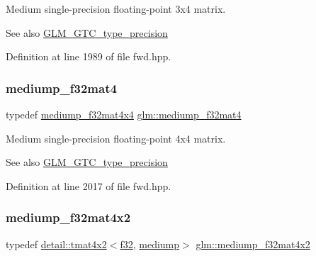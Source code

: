 Medium single-\/precision floating-\/point 3x4 matrix. \begin{DoxySeeAlso}{See also}
\hyperlink{group__gtc__type__precision}{G\+L\+M\+\_\+\+G\+T\+C\+\_\+type\+\_\+precision} 
\end{DoxySeeAlso}


Definition at line 1989 of file fwd.\+hpp.

\mbox{\label{group__gtc__type__precision_ga56bd98ec31b6abc0315d688d4ecd94a0}} 
\subsubsection{\texorpdfstring{mediump\+\_\+f32mat4}{mediump\_f32mat4}}
{\footnotesize\ttfamily typedef \hyperlink{group__gtc__type__precision_ga8f83086fffe71f9cd15e75a1de101ba6}{mediump\+\_\+f32mat4x4} \hyperlink{group__gtc__type__precision_ga56bd98ec31b6abc0315d688d4ecd94a0}{glm\+::mediump\+\_\+f32mat4}}

Medium single-\/precision floating-\/point 4x4 matrix. \begin{DoxySeeAlso}{See also}
\hyperlink{group__gtc__type__precision}{G\+L\+M\+\_\+\+G\+T\+C\+\_\+type\+\_\+precision} 
\end{DoxySeeAlso}


Definition at line 2017 of file fwd.\+hpp.

\mbox{\label{group__gtc__type__precision_ga3400d5463f0a58cf3959406aa2b69f72}} 
\subsubsection{\texorpdfstring{mediump\+\_\+f32mat4x2}{mediump\_f32mat4x2}}
{\footnotesize\ttfamily typedef \hyperlink{structglm_1_1detail_1_1tmat4x2}{detail\+::tmat4x2}$<$\hyperlink{group__gtc__type__precision_ga0ec999b57f5330d9021256e96038df04}{f32}, \hyperlink{namespaceglm_a0f04f086094c747d227af4425893f545a6416f3ea0c9025fb21ed50c4d6620482}{mediump}$>$ \hyperlink{group__gtc__type__precision_ga3400d5463f0a58cf3959406aa2b69f72}{glm\+::mediump\+\_\+f32mat4x2}}

